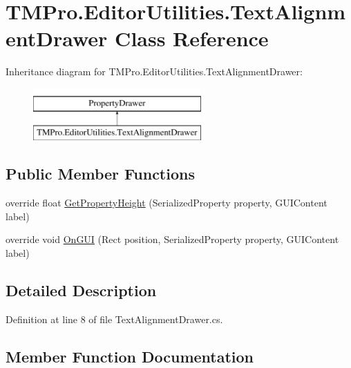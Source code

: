 \hypertarget{class_t_m_pro_1_1_editor_utilities_1_1_text_alignment_drawer}{}\section{T\+M\+Pro.\+Editor\+Utilities.\+Text\+Alignment\+Drawer Class Reference}
\label{class_t_m_pro_1_1_editor_utilities_1_1_text_alignment_drawer}
Inheritance diagram for T\+M\+Pro.\+Editor\+Utilities.\+Text\+Alignment\+Drawer\+:\begin{figure}[H]
\begin{center}
\leavevmode
\includegraphics[height=2.000000cm]{class_t_m_pro_1_1_editor_utilities_1_1_text_alignment_drawer}
\end{center}
\end{figure}
\subsection*{Public Member Functions}
\begin{DoxyCompactItemize}
\item 
override float \mbox{\hyperlink{class_t_m_pro_1_1_editor_utilities_1_1_text_alignment_drawer_a62390105f2d52e32ba900e6d8fca3faa}{Get\+Property\+Height}} (Serialized\+Property property, G\+U\+I\+Content label)
\item 
override void \mbox{\hyperlink{class_t_m_pro_1_1_editor_utilities_1_1_text_alignment_drawer_a3bbf4975e7620733f28e5a8da37ce9ed}{On\+G\+UI}} (Rect position, Serialized\+Property property, G\+U\+I\+Content label)
\end{DoxyCompactItemize}


\subsection{Detailed Description}


Definition at line 8 of file Text\+Alignment\+Drawer.\+cs.



\subsection{Member Function Documentation}
\mbox{\label{class_t_m_pro_1_1_editor_utilities_1_1_text_alignment_drawer_a62390105f2d52e32ba900e6d8fca3faa}} 

